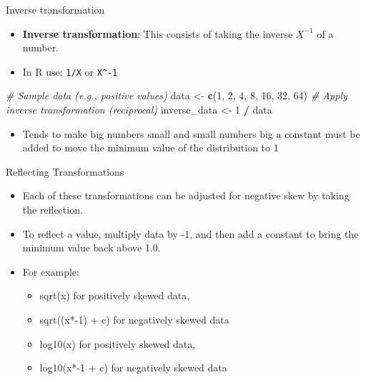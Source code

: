 \documentclass[
  ignorenonframetext,
]{beamer}
\newenvironment{Shaded}{\begin{snugshade}}{\end{snugshade}}
\newcommand{\CommentTok}[1]{\textcolor[rgb]{0.56,0.35,0.01}{\textit{#1}}}
\newcommand{\DecValTok}[1]{\textcolor[rgb]{0.00,0.00,0.81}{#1}}
\newcommand{\FunctionTok}[1]{\textcolor[rgb]{0.13,0.29,0.53}{\textbf{#1}}}
\newcommand{\NormalTok}[1]{#1}
\newcommand{\OtherTok}[1]{\textcolor[rgb]{0.56,0.35,0.01}{#1}}
\newcommand{\SpecialCharTok}[1]{\textcolor[rgb]{0.81,0.36,0.00}{\textbf{#1}}}
\providecommand{\tightlist}{%
  \setlength{\itemsep}{0pt}\setlength{\parskip}{0pt}}
\begin{document}
\begin{frame}[fragile]{Inverse transformation}
\label{inverse-transformation}
\begin{itemize}
\tightlist
\item
  \textbf{Inverse transformation}: This consists of taking the inverse
  \(X^{-1}\) of a number.
\item
  In R use: \texttt{1/X} or \texttt{X\^{}-1}
\end{itemize}

\begin{Shaded}
\begin{Highlighting}[]
\CommentTok{\# Sample data (e.g., positive values)}
\NormalTok{data }\OtherTok{\textless{}{-}} \FunctionTok{c}\NormalTok{(}\DecValTok{1}\NormalTok{, }\DecValTok{2}\NormalTok{, }\DecValTok{4}\NormalTok{, }\DecValTok{8}\NormalTok{, }\DecValTok{16}\NormalTok{, }\DecValTok{32}\NormalTok{, }\DecValTok{64}\NormalTok{)}
\CommentTok{\# Apply inverse transformation (reciprocal)}
\NormalTok{inverse\_data }\OtherTok{\textless{}{-}} \DecValTok{1} \SpecialCharTok{/}\NormalTok{ data}
\end{Highlighting}
\end{Shaded}

\begin{itemize}
\tightlist
\item
  Tends to make big numbers small and small numbers big a constant must
  be added to move the minimum value of the distribution to 1
\end{itemize}
\end{frame}

\begin{frame}{Reflecting Transformations}
\label{reflecting-transformations}
\begin{itemize}
\tightlist
\item
  Each of these transformations can be adjusted for negative skew by
  taking the reflection.
\end{itemize}

\begin{itemize}
\tightlist
\item
  To reflect a value, multiply data by -1, and then add a constant to
  bring the minimum value back above 1.0.
\end{itemize}

\begin{itemize}
\tightlist
\item
  For example:

  \begin{itemize}
  \item
    sqrt(x) for positively skewed data,
  \item
    sqrt((x*-1) + c) for negatively skewed data
  \item
    log10(x) for positively skewed data,
  \item
    log10(x*-1 + c) for negatively skewed data
  \end{itemize}
\end{itemize}
\end{frame}
\end{document}
